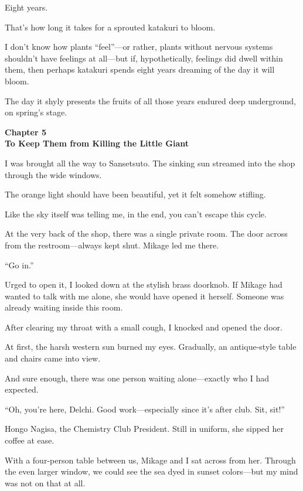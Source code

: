 \documentclass[
    a4paper,
    12pt,
    twoside,
    openany,
    UTF8,
    fontset=windows
]{ctexbook}
\begin{document}
Eight years.

That's how long it takes for a sprouted katakuri to bloom.

I don't know how plants ``feel''---or rather, plants without nervous systems shouldn't have feelings at all---but if, hypothetically, feelings did dwell within them, then perhaps katakuri spends eight years dreaming of the day it will bloom.

The day it shyly presents the fruits of all those years endured deep underground, on spring's stage.

\clearpage
\thispagestyle{plain}
\begin{center}
    \large\bfseries
    Chapter 5\\
    To Keep Them from Killing the Little Giant
\end{center}
\label{sec:ch5}
\vspace{1cm}

I was brought all the way to Sansetsuto. The sinking sun streamed into the shop through the wide windows.

The orange light should have been beautiful, yet it felt somehow stifling.

Like the sky itself was telling me, in the end, you can't escape this cycle.

At the very back of the shop, there was a single private room. The door across from the restroom---always kept shut. Mikage led me there.

``Go in.''

Urged to open it, I looked down at the stylish brass doorknob. If Mikage had wanted to talk with me alone, she would have opened it herself. Someone was already waiting inside this room.

After clearing my throat with a small cough, I knocked and opened the door.

At first, the harsh western sun burned my eyes. Gradually, an antique-style table and chairs came into view.

And sure enough, there was one person waiting alone---exactly who I had expected.

``Oh, you're here, Delchi. Good work---especially since it's after club. Sit, sit!''

Hongo Nagisa, the Chemistry Club President. Still in uniform, she sipped her coffee at ease.

With a four-person table between us, Mikage and I sat across from her. Through the even larger window, we could see the sea dyed in sunset colors---but my mind was not on that at all.
\end{document}
